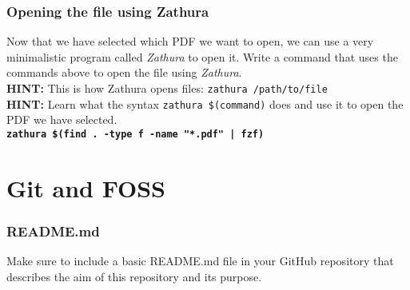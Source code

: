 \documentclass[titlepage, 12pt]{article}
\newcommand{\code}{\texttt}
\begin{document}
	\subsubsection{Opening the file using Zathura}
	Now that we have selected which PDF we want to open, we can use a very minimalistic program called \textit{Zathura} to open it. Write a command that uses the commands above to open the file using \textit{Zathura}.
	\\
	\textbf{HINT:} This is how Zathura opens files: \code{zathura /path/to/file}
	\\
	\textbf{HINT:} Learn what the syntax \code{zathura \$(command)} does and use it to open the PDF we have selected.
	\\
	\textbf{\code{zathura \$(find . -type f -name "*.pdf" | fzf)}}
	
	\section{Git and FOSS}
	\subsubsection{README.md}
	Make sure to include a basic README.md file in your GitHub repository that describes the aim of this repository and its purpose.
\end{document}
